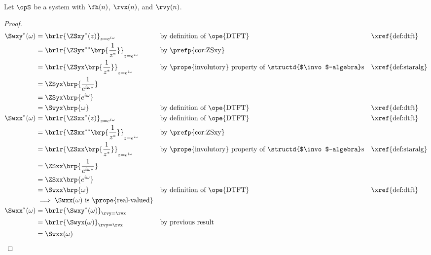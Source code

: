 \begin{corollary}
\label{cor:Swxy_sym}
Let $\opS$ be a system with  $\fh(n)$,
 $\rvx(n)$, and  $\rvy(n)$.
\end{corollary}
\begin{proof}
\begin{align*}
   \Swxy^\ast(\omega)
     &= \brlr{\ZSxy^\ast(z)}_{z=e^{i\omega}}
     && \text{by definition of \ope{DTFT}}
     && \text{\xref{def:dtft}}
   \\&= \brlr{\ZSyx^{\ast\ast}\brp{\frac{1}{z^\ast}}}_{z=e^{i\omega}}
     && \text{by \prefp{cor:ZSxy}}
   \\&= \brlr{\ZSyx\brp{\frac{1}{z^\ast}}}_{z=e^{i\omega}}
     && \text{by \prope{involutory} property of \structd{$\invo$-algebra}s}
     && \text{\xref{def:staralg}}
   \\&= \ZSyx\brp{\frac{1}{e^{i\omega\ast}}}
   \\&= \ZSyx\brp{e^{i\omega}}
   \\&= \Swyx\brp{\omega}
     && \text{by definition of \ope{DTFT}}
     && \text{\xref{def:dtft}}
   \\
   \Swxx^\ast(\omega)
     &= \brlr{\ZSxx^\ast(z)}_{z=e^{i\omega}}
     && \text{by definition of \ope{DTFT}}
     && \text{\xref{def:dtft}}
   \\&= \brlr{\ZSxx^{\ast\ast}\brp{\frac{1}{z^\ast}}}_{z=e^{i\omega}}
     && \text{by \prefp{cor:ZSxy}}
   \\&= \brlr{\ZSxx\brp{\frac{1}{z^\ast}}}_{z=e^{i\omega}}
     && \text{by \prope{involutory} property of \structd{$\invo$-algebra}s}
     && \text{\xref{def:staralg}}
   \\&= \ZSxx\brp{\frac{1}{e^{i\omega\ast}}}
   \\&= \ZSxx\brp{e^{i\omega}}
   \\&= \Swxx\brp{\omega}
     && \text{by definition of \ope{DTFT}}
     && \text{\xref{def:dtft}}
   \\&\implies\text{$\Swxx(\omega)$ is \prope{real-valued}}
   \\
   \Swxx^\ast(\omega)
     &= \brlr{\Swxy^\ast(\omega)}_{\rvy=\rvx}
   \\&= \brlr{\Swyx(\omega)}_{\rvy=\rvx}
     && \text{by previous result}
   \\&= \Swxx(\omega)
\end{align*}
\end{proof}
